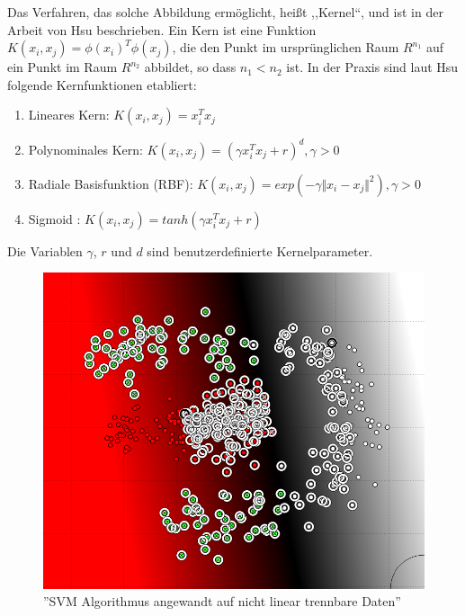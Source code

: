 Das Verfahren, das solche Abbildung ermöglicht, heißt ,,Kernel``, und ist in der Arbeit von Hsu\cite{hsu2003practical} beschrieben. Ein Kern ist eine Funktion 
$K(x_i,x_j) = \phi(x_i)^T \phi(x_j)$, die den Punkt im ursprünglichen Raum $R^{n_1}$ auf ein Punkt im Raum $R^{n_2}$ abbildet, so dass $n_1 < n_2$ ist. In der Praxis sind laut Hsu\cite{hsu2003practical} folgende Kernfunktionen etabliert:
\begin{enumerate}
\item Lineares Kern: $K(x_i,x_j) = x_i^T x_j$
\item Polynominales Kern: $K(x_i,x_j) = (\gamma x_i^T x_j + r)^d, \gamma > 0$
\item Radiale Basisfunktion (RBF): $K(x_i,x_j) = exp(-\gamma \Vert x_i - x_j \Vert^2), \gamma > 0$
\item Sigmoid : $K(x_i,x_j) = tanh(\gamma x_i^T x_j + r)$
\end{enumerate}
Die Variablen $\gamma$, $r$ und $d$ sind benutzerdefinierte Kernelparameter.

\begin{figure}
\centering
\includegraphics[width=\textwidth,angle=90]{Bilder/svm-nonlinear-issue.png}
\caption{''SVM Algorithmus angewandt auf nicht linear trennbare Daten''}
\label{fig:SVM-NONLINEAR-ISSUE}
\end{figure}

